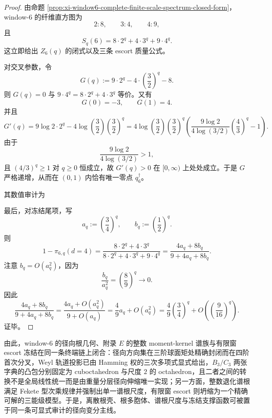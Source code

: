 \begin{proof}
由命题 \ref{prop:xi-window6-complete-finite-scale-spectrum-closed-form}，window-\(6\) 的纤维直方图为
\[
2:8,\qquad 3:4,\qquad 4:9,
\]
且
\[
S_q(6)=8\cdot 2^q+4\cdot 3^q+9\cdot 4^q.
\]
这立即给出 \(Z_6(q)\) 的闭式以及三条 escort 质量公式。

对交叉参数，令
\[
G(q):=9\cdot 2^q-4\cdot \left(\frac32\right)^q-8.
\]
则 \(G(q)=0\) 与
\(
9\cdot 4^q=8\cdot 2^q+4\cdot 3^q
\)
等价。又有
\[
G(0)=-3,
\qquad
G(1)=4.
\]
并且
\[
G'(q)
=
9\log 2\cdot 2^q
-4\log\!\left(\frac32\right)\left(\frac32\right)^q
=
4\log\!\left(\frac32\right)\left(\frac32\right)^q
\left(
\frac{9\log 2}{4\log(3/2)}\left(\frac43\right)^q-1
\right).
\]
由于
\[
\frac{9\log 2}{4\log(3/2)}>1,
\]
且 \((4/3)^q\ge 1\) 对 \(q\ge 0\) 恒成立，故 \(G'(q)>0\) 在 \([0,\infty)\) 上处处成立。于是 \(G\) 严格递增，从而在 \((0,1)\) 内恰有唯一零点 \(q_6^\dagger\)。

其数值审计为


最后，对冻结尾项，写
\[
a_q:=\left(\frac34\right)^q,
\qquad
b_q:=\left(\frac12\right)^q.
\]
则
\[
1-\pi_{6,q}(d=4)
=
\frac{8\cdot 2^q+4\cdot 3^q}{8\cdot 2^q+4\cdot 3^q+9\cdot 4^q}
=
\frac{4a_q+8b_q}{9+4a_q+8b_q}.
\]
注意 \(b_q=O(a_q^2)\)，因为
\[
\frac{b_q}{a_q^2}
=
\left(\frac{8}{9}\right)^q
\longrightarrow 0.
\]
因此
\[
\frac{4a_q+8b_q}{9+4a_q+8b_q}
=
\frac{4a_q+O(a_q^2)}{9+O(a_q)}
=
\frac49 a_q+O(a_q^2)
=
\frac49\left(\frac34\right)^q
+O\!\left(\left(\frac{9}{16}\right)^q\right).
\]
证毕。
\end{proof}

\noindent
由此，window-\(6\) 的径向根几何、附录 \(E\) 的整数 moment-kernel 谱族与有限窗 escort 冻结在同一条终端链上闭合：径向方向集在三阶球面矩处精确封闭而在四阶首次分叉，Weyl 轨道投影已由 Hamming 权的三次多项式显式给出，\(B_3/C_3\) 两张字典的凸包分别固定为 cuboctahedron 与尺度 \(2\) 的 octahedron，且二者之间的转换不是全局线性统一而是由重量分层径向伸缩唯一实现；另一方面，整数退化谱根满足 Fekete 型次乘规律并强制出单一谱根尺度，有限窗 escort 则坍缩为一个精确可解的三能级模型。于是，离散根壳、根多胞体、谱根尺度与冻结支撑函数可被置于同一条可显式审计的径向变分主线。
